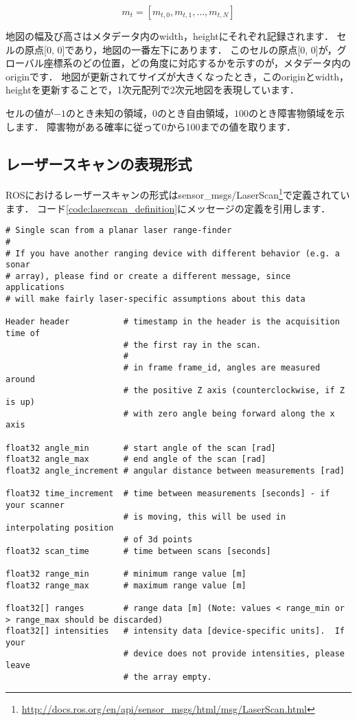 \documentclass[{../../master}]{subfiles}
\begin{document}
\begin{equation}
  m_{t} = [m_{t, 0}, m_{t, 1},  \ldots, m_{t, N}]
\end{equation}

地図の幅及び高さはメタデータ内の\textsf{width}，\textsf{height}にそれぞれ記録されます．
セルの原点[0, 0]であり，地図の一番左下にあります．
このセルの原点[0, 0]が，グローバル座標系のどの位置，どの角度に対応するかを示すのが，メタデータ内の\textsf{origin}です．
地図が更新されてサイズが大きくなったとき，この\textsf{origin}と\textsf{width}，\textsf{height}を更新することで，1次元配列で2次元地図を表現しています．

セルの値が$-1$のとき未知の領域，$0$のとき自由領域，$100$のとき障害物領域を示します．
障害物がある確率に従って0から100までの値を取ります．

\subsection{レーザースキャンの表現形式}

ROSにおけるレーザースキャンの形式は\textsf{sensor\_msgs/LaserScan}\footnote{\url{http://docs.ros.org/en/api/sensor_msgs/html/msg/LaserScan.html}}で定義されています．
コード\ref{code:laserscan_definition}にメッセージの定義を引用します．

\begin{lstlisting}[label=code:laserscan_definition, caption=Message Definition of \textsf{sensor\_msgs/LaserScan}]
# Single scan from a planar laser range-finder
#
# If you have another ranging device with different behavior (e.g. a sonar
# array), please find or create a different message, since applications
# will make fairly laser-specific assumptions about this data

Header header           # timestamp in the header is the acquisition time of 
                        # the first ray in the scan.
                        #
                        # in frame frame_id, angles are measured around 
                        # the positive Z axis (counterclockwise, if Z is up)
                        # with zero angle being forward along the x axis
                        
float32 angle_min       # start angle of the scan [rad]
float32 angle_max       # end angle of the scan [rad]
float32 angle_increment # angular distance between measurements [rad]

float32 time_increment  # time between measurements [seconds] - if your scanner
                        # is moving, this will be used in interpolating position
                        # of 3d points
float32 scan_time       # time between scans [seconds]

float32 range_min       # minimum range value [m]
float32 range_max       # maximum range value [m]

float32[] ranges        # range data [m] (Note: values < range_min or > range_max should be discarded)
float32[] intensities   # intensity data [device-specific units].  If your
                        # device does not provide intensities, please leave
                        # the array empty.
\end{lstlisting}
\end{document}
